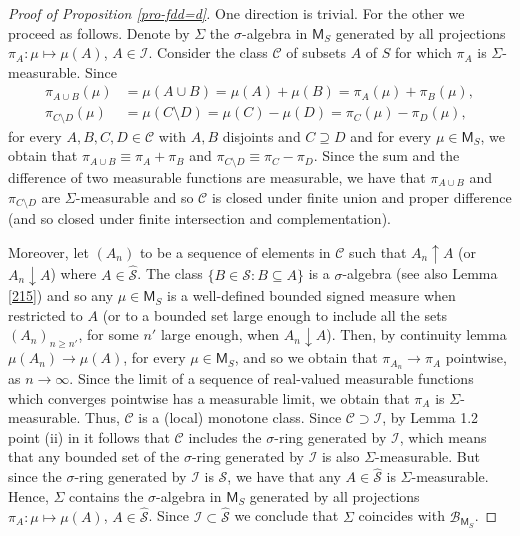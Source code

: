 \documentclass{article}
\theoremstyle{plain}
\theoremstyle{remark}
\begin{document}
\begin{proof}[Proof of Proposition \ref{pro-fdd=d}]
	One direction is trivial. For the other we proceed as follows. Denote by $\Sigma$ the $\sigma$-algebra in $\mathsf{M}_{S}$ generated by all projections $\pi_{A}:\mu\mapsto\mu(A)$, $A\in\mathcal{I}$. Consider the class $\mathcal{C}$ of subsets $A$ of $S$ for which $\pi_{A}$ is $\Sigma$-measurable. Since 
	\begin{align*}
		\pi_{A\cup B}(\mu)&=\mu(A\cup B)=\mu(A)+\mu(B)=\pi_A(\mu)+\pi_B(\mu),\\
		\pi_{C\setminus D}(\mu)&=\mu(C\setminus D)=\mu(C)-\mu(D)=\pi_C(\mu)-\pi_D(\mu),
	\end{align*}
	for every $A,B,C,D\in\mathcal{C}$ with $A,B$ disjoints and $C\supseteq D$ and for every $\mu\in\mathsf{M}_S$, we obtain that $\pi_{A\cup B}\equiv\pi_A+\pi_B$ and $\pi_{C\setminus D}\equiv\pi_C-\pi_D$. Since the sum and the difference of two measurable functions are measurable, we have that $\pi_{A\cup B}$ and $\pi_{C\setminus D}$ are $\Sigma$-measurable and so $\mathcal{C}$ is closed under finite union and proper difference (and so closed under finite intersection and complementation). 
	
	Moreover, let $(A_n)$ to be a sequence of elements in $\mathcal{C}$ such that $A_n\uparrow A$ (or $A_n\downarrow A$) where $A\in\hat{\mathcal{S}}$. The class $\{B\in\mathcal{S}:B\subseteq A\}$ is a $\sigma$-algebra (see also Lemma \ref{215}) and so any $\mu\in \mathsf{M}_{S}$ is a well-defined bounded signed measure when restricted to $A$ (or to a bounded set large enough to include all the sets $(A_n)_{n\geq n'}$, for some $n'$ large enough, when $A_n\downarrow A$). Then, by continuity lemma $\mu(A_n)\to\mu(A)$, for every $\mu\in \mathsf{M}_{S}$, and so we obtain that $\pi_{A_n}\to\pi_A$ pointwise, as $n\to\infty$. Since the limit of a sequence of real-valued measurable functions which converges pointwise has a measurable limit, we obtain that $\pi_A$ is $\Sigma$-measurable. Thus, $\mathcal{C}$ is a (local) monotone class. Since $\mathcal{C}\supset\mathcal{I}$, by Lemma 1.2 point (ii) in \cite{Kallenberg2} it follows that $\mathcal{C}$ includes the $\sigma$-ring generated by $\mathcal{I}$, which means that any bounded set of the $\sigma$-ring generated by $\mathcal{I}$ is also $\Sigma$-measurable. But since the $\sigma$-ring generated by $\mathcal{I}$ is $\mathcal{S}$, we have that any $A\in\hat{\mathcal{S}}$ is $\Sigma$-measurable. Hence, $\Sigma$ contains the $\sigma$-algebra in $\mathsf{M}_{S}$ generated by all projections $\pi_{A}:\mu\mapsto\mu(A)$, $A\in\hat{\mathcal{S}}$. Since $\mathcal{I}\subset\hat{\mathcal{S}}$ we conclude that $\Sigma$ coincides with $\mathcal{B}_{\mathsf{M}_S}$.
	

\end{proof}
\end{document}
